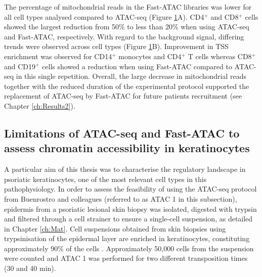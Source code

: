 \begin{figure}[htbp]
\label{figure:ATAC_vs_FAST_ATAC}
\end{figure} 



The percentage of mitochondrial reads in the Fast-ATAC libraries was lower for all cell types analysed compared to ATAC-seq (Figure \ref{figure:ATAC_vs_FAST_ATAC}A). CD4$^+$ and CD8$^+$ cells showed the largest reduction from 50\% to less than 20\% when using ATAC-seq and Fast-ATAC, respectively. With regard to the background signal, differing trends were observed across cell types (Figure \ref{figure:ATAC_vs_FAST_ATAC}B). Improvement in TSS enrichment was observed for CD14$^+$ monocytes and CD4$^+$ T cells whereas CD8$^+$ and CD19$^+$ cells showed a reduction when using Fast-ATAC compared to ATAC-seq in this single repetition. Overall, the large decrease in mitochondrial reads together with the reduced duration of the experimental protocol supported the replacement of ATAC-seq by Fast-ATAC for future patients recruitment (see Chapter \ref{ch:Results2}). 




\subsection{Limitations of ATAC-seq and Fast-ATAC to assess chromatin accessibility in keratinocytes}
A particular aim of this thesis was to characterise the regulatory landscape in psoriatic keratinocytes, one of the most relevant cell types in this pathophysiology. In order to assess the feasibility of using the ATAC-seq protocol from Buenrostro and colleagues \parencite{Buenrostro2013} (referred to as ATAC 1 in this subsection), epidermis from a psoriatic lesional skin biopsy was isolated, digested with trypsin and filtered through a cell strainer to ensure a single-cell suspension, as detailed in Chapter \ref{ch:Mat}. Cell suspensions obtained from skin biopsies using trypsinisation of the epidermal layer are enriched in keratinocytes, constituting approximately 90\% of the cells \parencite{Haftek1986}.  Approximately 50,000 cells from the suspension were counted and ATAC 1 was performed for two different transposition times (30 and 40 min). %

